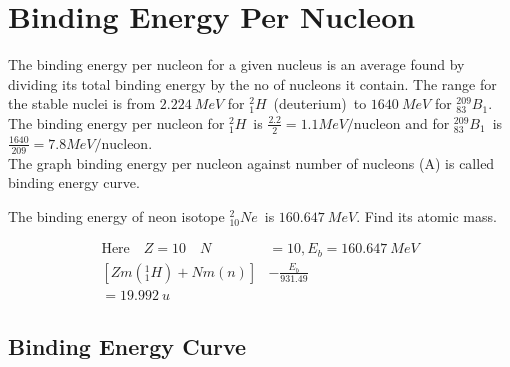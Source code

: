 \section{Binding Energy Per Nucleon}
The binding energy per nucleon for a given nucleus is an average found by dividing its total binding energy by the no of nucleons it contain. The range for the stable nuclei is from $2.224\ MeV$ for $^2_1H$\ (deuterium)\ to $1640\ MeV$ for $^{209}_{83}B_1$. The binding energy per nucleon for $^2_1H$\ is $\frac{2.2}{2}=1.1MeV/\text{nucleon}$ and for $^{209}_{83}B_1$\ is $\frac{1640}{209}=7.8 MeV/\text{nucleon}$.\\
The graph binding energy per nucleon against number of nucleons (A) is called binding energy curve.
\begin{exercise}
	The binding energy of neon isotope $^2_{10}Ne$\ is $160.647\ MeV$. Find its atomic mass.
\end{exercise}
\begin{answer}
	\begin{align*}
	\text{Here}\quad Z=10\quad N&=10,E_b=160.647 \ MeV\\
	\left[ Zm(^1_1H)+Nm(n)\right] &-\frac{E_b}{931.49}\\
	=19.992 \ u
	\end{align*}
\end{answer}
\subsection{Binding Energy Curve}
